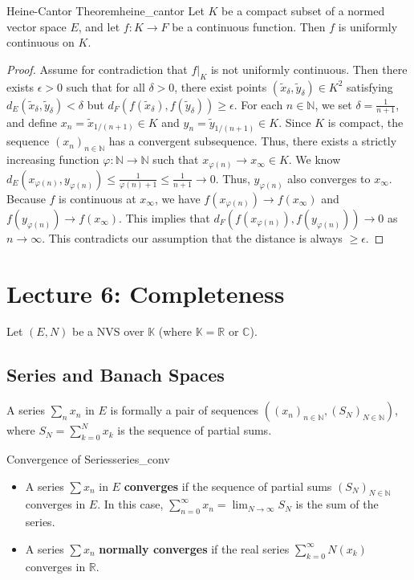 \documentclass[11pt, a4paper]{article}
\newcommand{\R}{\mathbb{R}}
\newcommand{\N}{\mathbb{N}}
\newcommand{\C}{\mathbb{C}}
\begin{document}
\begin{theorem}{Heine-Cantor Theorem}{heine_cantor}
Let $K$ be a compact subset of a normed vector space $E$, and let $f: K \to F$ be a continuous function. Then $f$ is uniformly continuous on $K$.
\end{theorem}
\begin{proof}
Assume for contradiction that $f|_K$ is not uniformly continuous.
Then there exists $\epsilon > 0$ such that for all $\delta > 0$, there exist points $(\tilde{x}_\delta, \tilde{y}_\delta) \in K^2$ satisfying $d_E(\tilde{x}_\delta, \tilde{y}_\delta) < \delta$ but $d_F(f(\tilde{x}_\delta), f(\tilde{y}_\delta)) \ge \epsilon$.
For each $n \in \N$, we set $\delta = \frac{1}{n+1}$, and define $x_n = \tilde{x}_{1/(n+1)} \in K$ and $y_n = \tilde{y}_{1/(n+1)} \in K$.
Since $K$ is compact, the sequence $(x_n)_{n \in \N}$ has a convergent subsequence. Thus, there exists a strictly increasing function $\varphi: \N \to \N$ such that $x_{\varphi(n)} \to x_\infty \in K$.
We know $d_E(x_{\varphi(n)}, y_{\varphi(n)}) \le \frac{1}{\varphi(n)+1} \le \frac{1}{n+1} \to 0$. Thus, $y_{\varphi(n)}$ also converges to $x_\infty$.
Because $f$ is continuous at $x_\infty$, we have $f(x_{\varphi(n)}) \to f(x_\infty)$ and $f(y_{\varphi(n)}) \to f(x_\infty)$.
This implies that $d_F(f(x_{\varphi(n)}), f(y_{\varphi(n)})) \to 0$ as $n \to \infty$. This contradicts our assumption that the distance is always $\ge \epsilon$.
\end{proof}

\section{Lecture 6: Completeness}
Let $(E, N)$ be a NVS over $\mathbb{K}$ (where $\mathbb{K} = \R$ or $\C$).

\subsection{Series and Banach Spaces}
\begin{remark}{}{}
A series $\sum_{n} x_n$ in $E$ is formally a pair of sequences $\left((x_n)_{n \in \N}, (S_N)_{N \in \N}\right)$, where $S_N = \sum_{k=0}^N x_k$ is the sequence of partial sums.
\end{remark}

\begin{definition}{Convergence of Series}{series_conv}
\begin{itemize}
    \item A series $\sum x_n$ in $E$ \textbf{converges} if the sequence of partial sums $(S_N)_{N \in \N}$ converges in $E$. In this case, $\sum_{n=0}^\infty x_n = \lim_{N \to \infty} S_N$ is the sum of the series.
    \item A series $\sum x_n$ \textbf{normally converges} if the real series $\sum_{k=0}^\infty N(x_k)$ converges in $\R$.
\end{itemize}
\end{definition}
\end{document}
